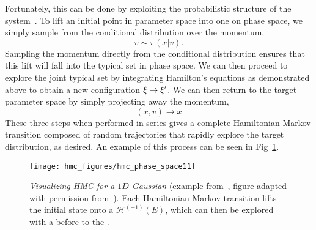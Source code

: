 \documentclass[../main.tex]{subfiles}
\begin{document}
Fortunately, this can be done by exploiting the probabilistic structure of the
system~\cite{Betancourt_2017}.
%
To lift an initial point in parameter space into one on phase space, we simply
sample from the conditional distribution over the momentum,
%
\begin{equation}
  v \sim \pi(x | v).
\end{equation}
%
Sampling the momentum directly from the conditional distribution ensures that
this lift will fall into the typical set in phase space.
%
We can then proceed to explore the joint typical set by integrating Hamilton's
equations as demonstrated above to obtain a new configuration $\xi \rightarrow
{\xi^{\prime}}$.
%
We can then return to the target parameter space by simply projecting away the
momentum,
%
\begin{equation}
  (x, v) \rightarrow x
\end{equation}
%
These three steps when performed in series gives a complete Hamiltonian Markov
transition composed of random trajectories that rapidly explore the target
distribution, as desired.
%
An example of this process can be seen in Fig~\ref{fig:hmc_phase_space}.
%
\begin{figure}[htpb]
  \texttt{[image: hmc\_figures/hmc\_phase\_space11]}
  \caption{\emph{Visualizing HMC for a $1D$ Gaussian} (example
		from~\cite{Betancourt_2017}, figure adapted with permission
		from~\cite{joeyl2hmc}). Each Hamiltonian Markov transition lifts the
		initial state onto a \color{gray}{random level set of the Hamiltonian,
		}\color{black} $\mathcal{H}^{(-1)}(E)$, which can then be explored with a
		\color{blue}{Hamiltonian trajectory }\color{black} before
		\color{red}{projecting back down }\color{black} to the \color{green}{target
		parameter space}\color{black}.}%
\label{fig:hmc_phase_space}
\end{figure}
%
\vspace{-10pt}
\end{document}
